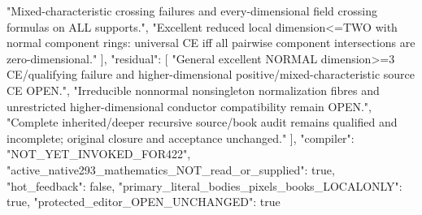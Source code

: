 \documentclass[11pt]{article}
\begin{document}
\begin{Full422Data}
{    "Mixed-characteristic crossing failures and every-dimensional field crossing formulas on ALL supports.",
    "Excellent reduced local dimension<=TWO with normal component rings: universal CE iff all pairwise component intersections are zero-dimensional."
  ],
  "residual": [
    "General excellent NORMAL dimension>=3 CE/qualifying failure and higher-dimensional positive/mixed-characteristic source CE OPEN.",
    "Irreducible nonnormal nonsingleton normalization fibres and unrestricted higher-dimensional conductor compatibility remain OPEN.",
    "Complete inherited/deeper recursive source/book audit remains qualified and incomplete; original closure and acceptance unchanged."
  ],
  "compiler": "NOT_YET_INVOKED_FOR422",
  "active_native293_mathematics_NOT_read_or_supplied": true,
  "hot_feedback": false,
  "primary_literal_bodies_pixels_books_LOCALONLY": true,
  "protected_editor_OPEN_UNCHANGED": true
}

\end{Full422Data}
\end{document}
